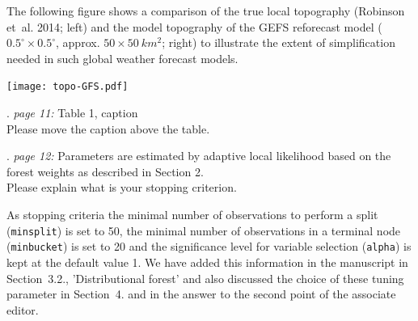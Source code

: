 \documentclass[american,foldmarks=false,noconfig]{uibklttr}
\newenvironment{review}{\fontshape{\itdefault}\fontseries{\bfdefault} \selectfont \smallskip}{\par}
\begin{document}
The following figure shows a comparison of the true local topography
(Robinson et~al. 2014; left)
and the model topography of the GEFS reforecast model
($0.5^\circ \times 0.5^\circ$, approx. $50 \times 50~km^2$; right) to illustrate
the extent of simplification needed in such global weather forecast models.

\begin{center}
\texttt{[image: topo-GFS.pdf]}
\end{center}





\begin{review}
12. {\color{quotecolor}\textit{page 11:} Table 1, caption}\\
Please move the caption above the table.
\end{review}


\begin{review}
13. {\color{quotecolor}\textit{page 12:} Parameters are estimated 
by adaptive local likelihood based on the forest weights as 
described in Section 2.}\\
Please explain what is your stopping criterion.
\end{review}

As stopping criteria the minimal number of observations to perform 
a split (\texttt{minsplit}) is set to 50, the minimal number of 
observations in a terminal node (\texttt{minbucket}) is set to 20 
and the significance level for variable selection (\texttt{alpha}) 
is kept at the default value 1. We have added this information in 
the manuscript in Section~3.2., 'Distributional forest' and
also discussed the choice of these tuning parameter in Section~4. and
in the answer to the second point of the associate editor.
\end{document}
